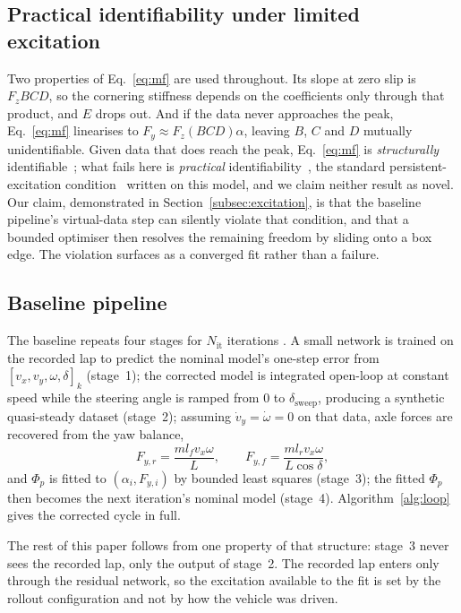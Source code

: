 \documentclass[lineno,12pt]{sn-jnl}
\newcommand{\phip}{\Phi_{p}}
\newcommand{\Fyf}{F_{y,f}}
\newcommand{\Fyr}{F_{y,r}}
\theoremstyle{thmstyleone}%
\theoremstyle{thmstyletwo}%
\theoremstyle{thmstylethree}%
\begin{document}
\subsection{Practical identifiability under limited excitation}
\label{subsec:identifiability}

Two properties of Eq.~\eqref{eq:mf} are used throughout. Its slope at zero
slip is $F_{z}BCD$, so the cornering stiffness depends on the coefficients only
through that product, and $E$ drops out. And if the data
never approaches the peak, Eq.~\eqref{eq:mf} linearises to $F_{y}\approx
F_{z}(BCD)\alpha$, leaving $B$, $C$ and $D$ mutually unidentifiable. Given data
that does reach the peak, Eq.~\eqref{eq:mf} is \emph{structurally}
identifiable~\cite{bellman1970structural}; what fails here is \emph{practical}
identifiability~\cite{raue2009practical}, the standard persistent-excitation
condition~\cite{ljung1999sysid,astrom1995adaptive} written on this model, and we
claim neither result as novel. Our claim, demonstrated in
Section~\ref{subsec:excitation}, is that the baseline pipeline's virtual-data
step can silently violate that condition, and that a bounded optimiser then
resolves the remaining freedom by sliding onto a box edge. The violation
surfaces as a converged fit rather than a failure.

\subsection{Baseline pipeline}
\label{subsec:baseline}

The baseline repeats four stages for $N_{\mathrm{it}}$ iterations
\cite{ontrack2025}. A small network is trained on the recorded lap to predict
the nominal model's one-step error from $[v_{x},v_{y},\omega,\delta]_{k}$
(stage~1); the corrected model is integrated open-loop at constant speed while
the steering angle is ramped from $0$ to $\delta_{\mathrm{sweep}}$, producing a
synthetic quasi-steady dataset (stage~2); assuming $\dot v_{y}=\dot\omega=0$ on
that data, axle forces are recovered from the yaw balance,
\begin{equation}
\Fyr=\frac{m l_{f}v_{x}\omega}{L},\qquad
\Fyf=\frac{m l_{r} v_{x}\omega}{L\cos\delta},
\label{eq:ssforces}
\end{equation}
and $\phip$ is fitted to $(\alpha_{i},F_{y,i})$ by bounded least squares
(stage~3); the fitted $\phip$ then becomes the next iteration's nominal model
(stage~4). Algorithm~\ref{alg:loop} gives the corrected cycle in full.

The rest of this paper follows from one property of that structure: stage~3
never sees the recorded lap, only the output of stage~2. The recorded lap
enters only through the residual network, so the excitation available to the
fit is set by the rollout configuration and not by how the vehicle was driven.
\end{document}
